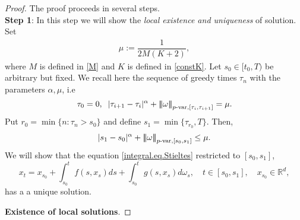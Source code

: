 \documentclass[10pt]{article}
\numberwithin{equation}{section} %
\newcommand{\R}{\ensuremath{\mathbb{R}}}
\newcommand{\ltn}{\ensuremath{\left| \! \left| \! \left|}}
\newcommand{\rtn}{\ensuremath{\right| \! \right| \! \right|}}
\begin{document}
\begin{proof}	
The proof proceeds in several steps.\\
{\bf {Step 1}}: In this step we will show the {\em local existence and uniqueness} of solution.
Set
	\begin{eqnarray}
	\mu := \dfrac{1}{2M(K+2)},\label{constmu}
	\end{eqnarray}
	where $M$ is defined in \eqref{M} and $K$ is defined in \eqref{constK}.
	Let $s_0\in [t_0,T)$ be arbitrary but fixed.
	We recall here the sequence of greedy times $\tau_n$ with the parameters $\alpha,\mu$, i.e 
      	\begin{equation*}
\tau_0 = 0,\;\;|\tau_{i+1}-\tau_i|^\alpha+\ltn\omega\rtn_{p\text{-var},[\tau_i,\tau_{i+1}]} = \mu.
\end{equation*}
Put $r_0= \min\{n: \tau_n> s_0\}$	and  define $s_1 = \min\{\tau_{r_0}, T\}$. Then, 
\begin{eqnarray}\label{constt1}
	|s_{1}-s_0|^{\alpha}+\ltn \omega \rtn_{p\text{-var},[s_0,s_{1}]} \leq \mu. 
\end{eqnarray}
	We will show that the equation \eqref{integral.eq.Stieltes} restricted to $[s_0,s_1]$,
	$$
	x_t=x_{s_0} +\int_{s_0}^t f(s,x_s) ds + \int_{s_0}^tg(s,x_s)d\omega_s,\quad t\in [s_0,s_1],\quad x_{s_0}\in\R^d,
	$$
has a a unique solution. \medskip

	{\bf{Existence of local solutions}}.\medskip
	

\end{proof}
\end{document}
